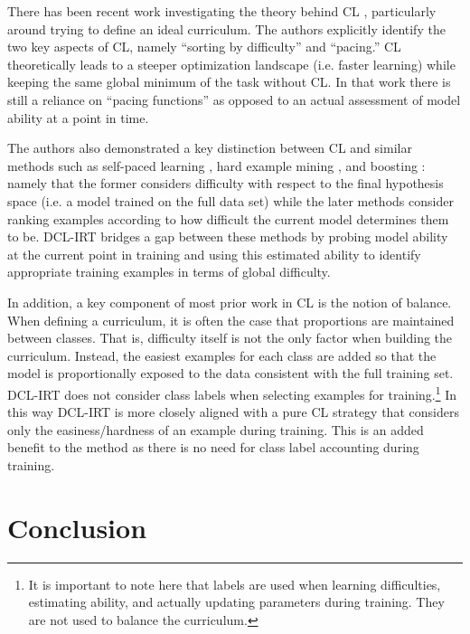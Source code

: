 \documentclass[letterpaper]{article} %
\begin{document}
There has been recent work investigating the theory behind CL \cite{weinshall_curriculum_2018-1,hacohen_power_2019-2}, particularly around trying to define an ideal curriculum.
The authors explicitly identify the two key aspects of CL, namely ``sorting by difficulty'' and ``pacing.''
CL theoretically leads to a steeper optimization landscape (i.e. faster learning) while keeping the same global minimum of the task without CL.
In that work there is still a reliance on ``pacing functions'' as opposed to an actual assessment of model ability at a point in time.

The authors also demonstrated a key distinction between CL and similar methods such as self-paced learning \cite{kumar_self-paced_2010}, hard example mining \cite{shrivastava_training_2016}, and boosting \cite{freund_experiments_1996,freund_decision-theoretic_1997}: namely that the former considers difficulty with respect to the final hypothesis space (i.e. a model trained on the full data set) while the later methods consider ranking examples according to how difficult the current model determines them to be.
DCL-IRT bridges a gap between these methods by probing model ability at the current point in training and using this estimated ability to identify appropriate training examples in terms of global difficulty.

In addition, a key component of most prior work in CL is the notion of balance.
When defining a curriculum, it is often the case that proportions are maintained between classes.
That is, difficulty itself is not the only factor when building the curriculum.
Instead, the easiest examples for each class are added so that the model is proportionally exposed to the data consistent with the full training set.
DCL-IRT does not consider class labels when selecting examples for training.\footnote{It is important to note here that labels are used when learning difficulties, estimating ability, and actually updating parameters during training. They are not used to balance the curriculum.}
In this way DCL-IRT is more closely aligned with a pure CL strategy that considers only the easiness/hardness of an example during training.
This is an added benefit to the method as there is no need for class label accounting during training. 




\section{Conclusion} 
\end{document}
